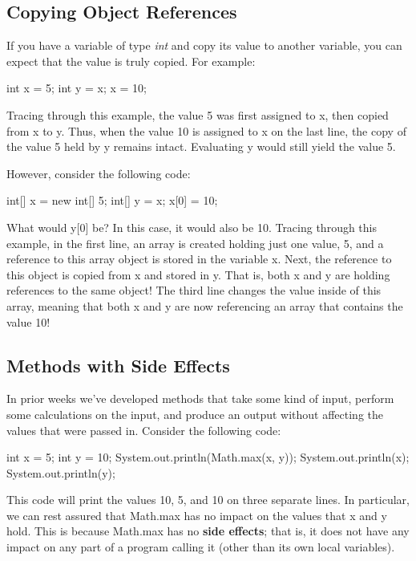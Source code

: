 \subsection{Copying Object References}

If you have a variable of type \textit{int} and copy its value to another variable, you can expect that the value is truly copied. For example:

\begin{code}
int x = 5;
int y = x;
x = 10;
\end{code}

Tracing through this example, the value 5 was first assigned to x, then copied from x to y. Thus, when the value 10 is assigned to x on the last line, the copy of the value 5 held by y remains intact. Evaluating y would still yield the value 5. 

However, consider the following code:

\begin{code}
int[] x = new int[] {5};
int[] y = x;
x[0] = 10;
\end{code}

What would y[0] be? In this case, it would also be 10. Tracing through this example, in the first line, an array is created holding just one value, 5, and a reference to this array object is stored in the variable x. Next, the reference to this object is copied from x and stored in y. That is, both x and y are holding references to the same object! The third line changes the value inside of this array, meaning that both x and y are now referencing an array that contains the value 10! 

\subsection{Methods with Side Effects}

In prior weeks we've developed methods that take some kind of input, perform some calculations on the input, and produce an output without affecting the values that were passed in. Consider the following code:

\begin{code}
int x = 5;
int y = 10;
System.out.println(Math.max(x, y));
System.out.println(x);
System.out.println(y);
\end{code}

This code will print the values 10, 5, and 10 on three separate lines. In particular, we can rest assured that Math.max has no impact on the values that x and y hold. This is because Math.max has no \textbf{side effects}; that is, it does not have any impact on any part of a program calling it (other than its own local variables). 

